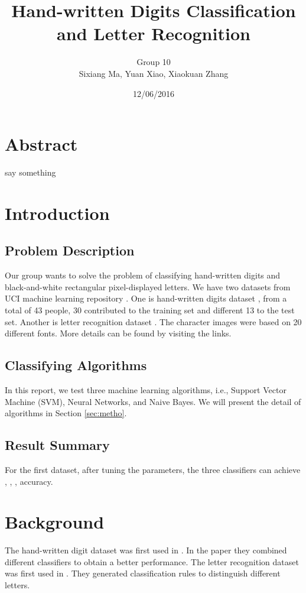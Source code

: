 \documentclass[11pt]{article}
\title{Hand-written Digits Classification and Letter Recognition}
\author{Group 10 \\ Sixiang Ma, Yuan Xiao, Xiaokuan Zhang}
\date{12/06/2016}
\begin{document}
\maketitle
\section*{Abstract}
say something

\section{Introduction}

\subsection{Problem Description}
Our group wants to solve the problem of classifying hand-written digits and  black-and-white rectangular pixel-displayed letters. We have two datasets from UCI machine learning repository \cite{Lichman2013}. One is hand-written digits dataset \cite{digitdataset}, from a total of 43 people, 30 contributed to the training set and different 13 to the test set. Another is letter recognition dataset \cite{letterdataset}. The character images were based on 20 different fonts. More details can be found by visiting the links.

\subsection{Classifying Algorithms}
In this report, we test three machine learning  algorithms, i.e., Support Vector Machine (SVM), Neural Networks, and Naive Bayes. We will present the detail of algorithms in Section \ref{sec:metho}.
\subsection{Result Summary}
For the first dataset, after tuning the parameters, the three classifiers can achieve , , , accuracy. 

\section{Background}
The hand-written digit dataset was first used in \cite{kaynak1995methods}. In the paper they combined different classifiers to obtain a better performance. The letter recognition dataset was first used in \cite{frey1991letter}. They generated classification rules to distinguish different letters.
\end{document}
